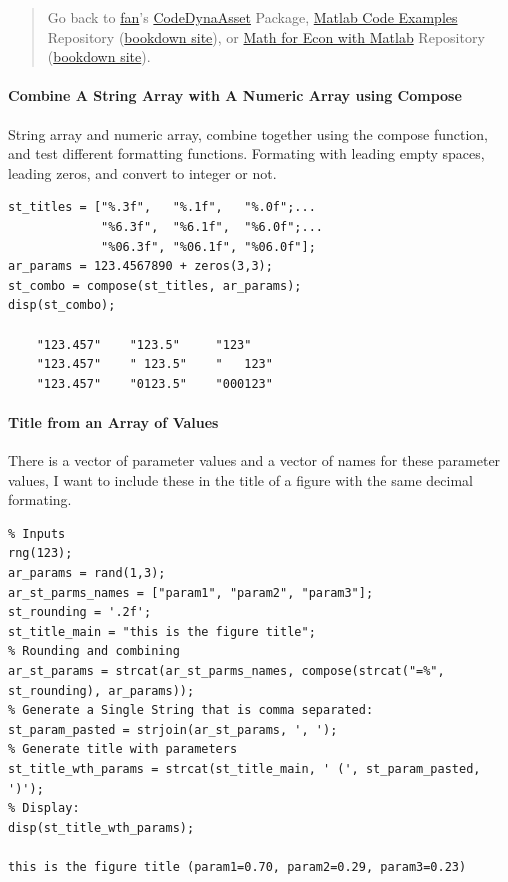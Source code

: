 \documentclass[
]{book}
\begin{document}
\begin{quote}
Go back to \href{http://fanwangecon.github.io/}{fan}'s \href{https://fanwangecon.github.io/CodeDynaAsset/}{CodeDynaAsset} Package, \href{https://fanwangecon.github.io/M4Econ/}{Matlab Code Examples} Repository (\href{https://fanwangecon.github.io/M4Econ/bookdown}{bookdown site}), or \href{https://fanwangecon.github.io/Math4Econ/}{Math for Econ with Matlab} Repository (\href{https://fanwangecon.github.io/Math4Econ/bookdown}{bookdown site}).
\end{quote}

\hypertarget{combine-a-string-array-with-a-numeric-array-using-compose}{%
\paragraph{Combine A String Array with A Numeric Array using Compose}\label{combine-a-string-array-with-a-numeric-array-using-compose}}

String array and numeric array, combine together using the compose
function, and test different formatting functions. Formating with
leading empty spaces, leading zeros, and convert to integer or not.

\begin{verbatim}
st_titles = ["%.3f",   "%.1f",   "%.0f";...
             "%6.3f",  "%6.1f",  "%6.0f";...
             "%06.3f", "%06.1f", "%06.0f"];
ar_params = 123.4567890 + zeros(3,3);
st_combo = compose(st_titles, ar_params);
disp(st_combo);

    "123.457"    "123.5"     "123"   
    "123.457"    " 123.5"    "   123"
    "123.457"    "0123.5"    "000123"
\end{verbatim}

\hypertarget{title-from-an-array-of-values}{%
\paragraph{Title from an Array of Values}\label{title-from-an-array-of-values}}

There is a vector of parameter values and a vector of names for these
parameter values, I want to include these in the title of a figure with
the same decimal formating.

\begin{verbatim}
% Inputs
rng(123);
ar_params = rand(1,3);
ar_st_parms_names = ["param1", "param2", "param3"];
st_rounding = '.2f';
st_title_main = "this is the figure title";
% Rounding and combining
ar_st_params = strcat(ar_st_parms_names, compose(strcat("=%", st_rounding), ar_params));
% Generate a Single String that is comma separated:
st_param_pasted = strjoin(ar_st_params, ', ');
% Generate title with parameters
st_title_wth_params = strcat(st_title_main, ' (', st_param_pasted, ')');
% Display:
disp(st_title_wth_params);

this is the figure title (param1=0.70, param2=0.29, param3=0.23)
\end{verbatim}
\end{document}
